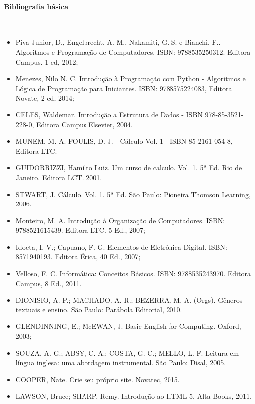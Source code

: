 \paragraph{Bibliografia básica}\
\
\begin{itemize}
	\item Piva Junior, D., Engelbrecht,  A. M., Nakamiti,  G. S. e Bianchi, F.. Algoritmos e Programação de Computadores. ISBN: 9788535250312. Editora Campus. 1 ed, 2012;
	\item Menezes, Nilo N. C. Introdução à Programação com Python - Algoritmos e Lógica de Programação para Iniciantes. ISBN: 9788575224083, Editora Novate, 2 ed, 2014;
	\item CELES, Waldemar. Introdução a Estrutura de Dados -  ISBN 978-85-3521-228-0, Editora Campus Elsevier, 2004.
	\item MUNEM, M. A. FOULIS, D. J. - Cálculo Vol. 1 - ISBN  85-2161-054-8, Editora LTC.
	\item GUIDORRIZZI, Hamilto Luiz. Um curso de calculo. Vol. 1. 5ª Ed. Rio de Janeiro. Editora LCT. 2001.
	\item STWART, J. Cálculo. Vol. 1. 5ª Ed. São Paulo: Pioneira Thomson Learning, 2006.
	\item Monteiro, M. A. Introdução à Organização de Computadores. ISBN: 9788521615439. Editora LTC. 5 Ed., 2007; 
	\item Idoeta, I. V.; Capuano, F. G. Elementos de Eletrônica Digital. ISBN: 8571940193. Editora Érica, 40 Ed., 2007;
	\item Velloso, F. C. Informática: Conceitos Básicos. ISBN: 9788535243970. Editora Campus, 8 Ed., 2011.
    \item DIONISIO, A. P.; MACHADO, A. R.; BEZERRA, M. A. (Orgs). Gêneros textuais e ensino. São Paulo: Parábola Editorial, 2010.
    \item GLENDINNING, E.; McEWAN, J. Basic English for Computing. Oxford, 2003;
    \item SOUZA, A. G.; ABSY, C. A.; COSTA, G. C.; MELLO, L. F. Leitura em língua inglesa: uma abordagem instrumental. São Paulo: Disal, 2005.
    \item COOPER, Nate.
          Crie seu próprio site.
          Novatec, 2015.
    
    \item LAWSON, Bruce; SHARP, Remy.
          Introdução ao HTML 5.
          Alta Books, 2011.
    

\end{itemize}
